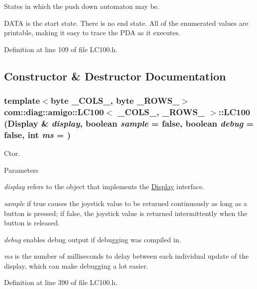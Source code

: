 States in which the push down automaton may be. 

DATA is the start state. There is no end state. All of the enumerated values are printable, making it easy to trace the PDA as it executes. 

Definition at line 109 of file LC100.h.



\subsection{Constructor \& Destructor Documentation}
\hypertarget{classcom_1_1diag_1_1amigo_1_1LC100_a731566b8debd903b62c873851641534f}{
\subsubsection[{LC100}]{\setlength{\rightskip}{0pt plus 5cm}template$<$byte \_\-COLS\_\-, byte \_\-ROWS\_\-$>$ {\bf com::diag::amigo::LC100}$<$ \_\-COLS\_\-, \_\-ROWS\_\- $>$::{\bf LC100} ({\bf Display} \& {\em display}, \/  boolean {\em sample} = {\ttfamily false}, \/  boolean {\em debug} = {\ttfamily false}, \/  int {\em ms} = {})}}
\label{classcom_1_1diag_1_1amigo_1_1LC100_a731566b8debd903b62c873851641534f}


Ctor. 


\begin{DoxyParams}{Parameters}
\item[{\em display}]refers to the object that implements the \hyperlink{structcom_1_1diag_1_1amigo_1_1Display}{Display} interface. \item[{\em sample}]if true causes the joystick value to be returned continuously as long as a button is pressed; if false, the joystick value is returned intermittently when the button is released. \item[{\em debug}]enables debug output if debugging was compiled in. \item[{\em ms}]is the number of milliseconds to delay between each individual update of the display, which can make debugging a lot easier. \end{DoxyParams}


Definition at line 390 of file LC100.h.



